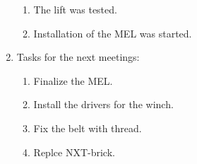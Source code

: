 \begin{enumerate}
\begin{enumerate}
		\item The lift was tested.
		
		\item Installation of the MEL was started.
		
	\end{enumerate}
	
	\item Tasks for the next meetings:
	\begin{enumerate}
		\item Finalize the MEL.
		
		\item Install the drivers for the winch.
		
		\item Fix the belt with thread.
		
		\item Replce NXT-brick.
		
	\end{enumerate}     
\end{enumerate}
\fillpage
